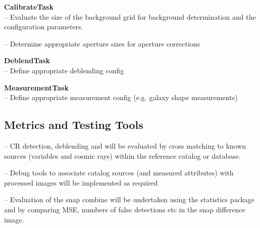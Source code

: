 \documentclass[prd, nofootinbib, floatfix, 11pt,tightenlines,times]{article}
\begin{document}

%


{\bf CalibrateTask}\\
-- Evaluate the size of the background grid for background
determination and the configuration parameters.

-- Determine appropriate  aperture sizes for aperture corrections%

{\bf DeblendTask}\\
-- Define appropriate deblending config


{\bf MeasurementTask}\\
-- Define appropriate measurement config (e.g. galaxy shape measurements)

\subsection{Metrics and Testing Tools}

-- CR detection, deblending and  will be evaluated by cross matching
to known sources (variables and cosmic rays)  within the reference
catalog or database.

-- Debug tools to associate catalog sources (and measured attributes)
with processed images will be implemented as required

-- Evaluation of the snap combine will be undertaken using the
statistics package and by comparing MSE, numbers of false detections
etc in the snap difference image.

\end{document}
